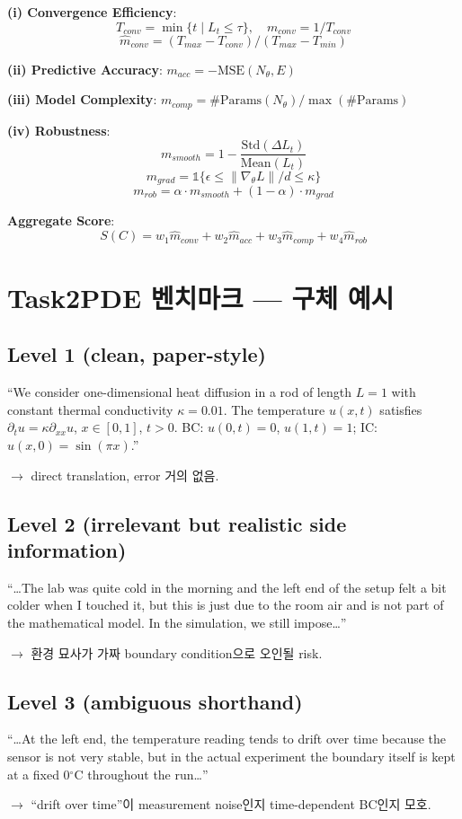 \documentclass[11pt,a4paper,oneside]{report}
\begin{document}
\textbf{(i) Convergence Efficiency}:
\[
T_{conv} = \min\{t \mid L_t \leq \tau\}, \quad m_{conv} = 1/T_{conv}
\]
\[
\hat{m}_{conv} = (T_{max} - T_{conv})/(T_{max} - T_{min})
\]

\textbf{(ii) Predictive Accuracy}: $m_{acc} = -\text{MSE}(N_\theta, E)$

\textbf{(iii) Model Complexity}: $m_{comp} = \#\text{Params}(N_\theta) / \max(\#\text{Params})$

\textbf{(iv) Robustness}:
\[
m_{smooth} = 1 - \frac{\text{Std}(\Delta L_t)}{\text{Mean}(L_t)}
\]
\[
m_{grad} = \mathbb{1}\{\epsilon \leq \|\nabla_\theta L\|/d \leq \kappa\}
\]
\[
m_{rob} = \alpha \cdot m_{smooth} + (1-\alpha) \cdot m_{grad}
\]

\textbf{Aggregate Score}:
\[
S(C) = w_1 \hat{m}_{conv} + w_2 \hat{m}_{acc} + w_3 \hat{m}_{comp} + w_4 \hat{m}_{rob}
\]

\section{Task2PDE 벤치마크 --- 구체 예시}

\subsection{Level 1 (clean, paper-style)}
\begin{quotebox}
``We consider one-dimensional heat diffusion in a rod of length $L=1$ with constant thermal conductivity $\kappa=0.01$. The temperature $u(x,t)$ satisfies $\partial_t u = \kappa \partial_{xx} u$, $x \in [0,1]$, $t > 0$. BC: $u(0,t)=0$, $u(1,t)=1$; IC: $u(x,0)=\sin(\pi x)$.''
\end{quotebox}
$\rightarrow$ direct translation, error 거의 없음.

\subsection{Level 2 (irrelevant but realistic side information)}
\begin{quotebox}
``\ldots The lab was quite cold in the morning and the left end of the setup felt a bit colder when I touched it, but this is just due to the room air and is not part of the mathematical model. In the simulation, we still impose\ldots''
\end{quotebox}
$\rightarrow$ 환경 묘사가 가짜 boundary condition으로 오인될 risk.

\subsection{Level 3 (ambiguous shorthand)}
\begin{quotebox}
``\ldots At the left end, the temperature reading tends to drift over time because the sensor is not very stable, but in the actual experiment the boundary itself is kept at a fixed 0$^\circ$C throughout the run\ldots''
\end{quotebox}
$\rightarrow$ ``drift over time''이 measurement noise인지 time-dependent BC인지 모호.
\end{document}
